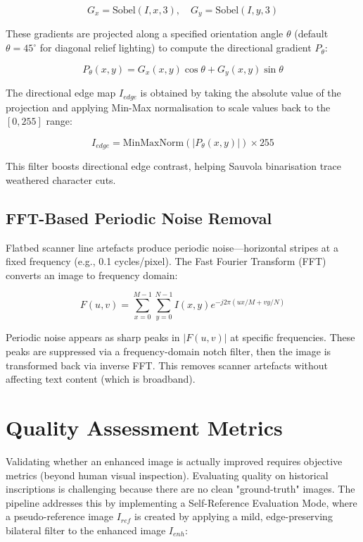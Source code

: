 \begin{equation}
G_x = \text{Sobel}(I, x, 3), \quad G_y = \text{Sobel}(I, y, 3)
\end{equation}

These gradients are projected along a specified orientation angle $\theta$ (default $\theta = 45^\circ$ for diagonal relief lighting) to compute the directional gradient $P_{\theta}$:

\begin{equation}
P_{\theta}(x, y) = G_x(x,y) \cos\theta + G_y(x,y) \sin\theta
\end{equation}

The directional edge map $I_{edge}$ is obtained by taking the absolute value of the projection and applying Min-Max normalisation to scale values back to the $[0, 255]$ range:

\begin{equation}
I_{edge} = \text{MinMaxNorm}\left(|P_\theta(x, y)|\right) \times 255
\end{equation}

This filter boosts directional edge contrast, helping Sauvola binarisation trace weathered character cuts.

\subsection{FFT-Based Periodic Noise Removal}

Flatbed scanner line artefacts produce periodic noise—horizontal stripes at a fixed frequency (e.g., 0.1 cycles/pixel). The Fast Fourier Transform (FFT) converts an image to frequency domain:

\begin{equation}
F(u, v) = \sum_{x=0}^{M-1} \sum_{y=0}^{N-1} I(x,y) e^{-j 2\pi (ux/M + vy/N)}
\end{equation}

Periodic noise appears as sharp peaks in $|F(u,v)|$ at specific frequencies. These peaks are suppressed via a frequency-domain notch filter, then the image is transformed back via inverse FFT. This removes scanner artefacts without affecting text content (which is broadband).

\section{Quality Assessment Metrics}

Validating whether an enhanced image is actually improved requires objective metrics (beyond human visual inspection). Evaluating quality on historical inscriptions is challenging because there are no clean "ground-truth" images. The pipeline addresses this by implementing a Self-Reference Evaluation Mode, where a pseudo-reference image $I_{ref}$ is created by applying a mild, edge-preserving bilateral filter to the enhanced image $I_{enh}$:

